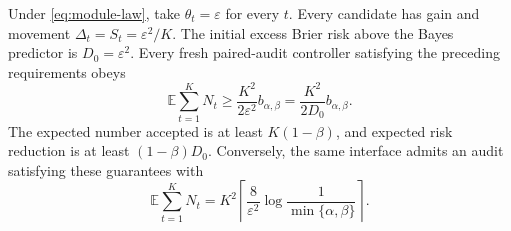 \begin{theorem}
\label{thm:reset-cost}
Under \eqref{eq:module-law}, take $\theta_t=\varepsilon$ for every $t$.
Every candidate has gain and movement
$\Delta_t=S_t=\varepsilon^2/K$. The initial excess Brier risk above the
Bayes predictor is $D_0=\varepsilon^2$.
Every fresh paired-audit controller satisfying the preceding requirements
obeys
\begin{equation}
 \mathbb E\sum_{t=1}^K N_t
 \ge\frac{K^2}{2\varepsilon^2}b_{\alpha,\beta}
 =\frac{K^2}{2D_0}b_{\alpha,\beta}.
 \label{eq:quadratic-reset}
\end{equation}
The expected number accepted is at least $K(1-\beta)$, and expected risk
reduction is at least $(1-\beta)D_0$.
Conversely, the same interface admits an audit satisfying these guarantees
with
\begin{equation}
 \mathbb E\sum_{t=1}^K N_t
 =K^2\left\lceil\frac8{\varepsilon^2}
       \log\frac1{\min\{\alpha,\beta\}}\right\rceil.
 \label{eq:quadratic-upper}
\end{equation}
\end{theorem}
